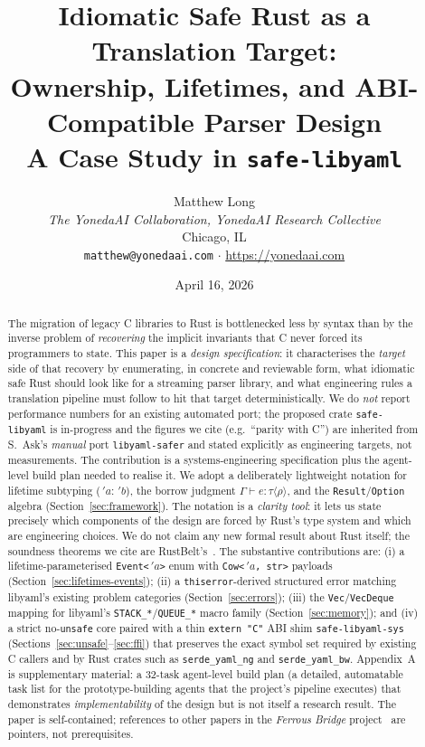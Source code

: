\documentclass[12pt]{article}
\title{Idiomatic Safe Rust as a Translation Target:\\
Ownership, Lifetimes, and ABI-Compatible Parser Design\\
{\large A Case Study in \texttt{safe-libyaml}}}
\author{Matthew Long \\
\textit{The YonedaAI Collaboration, YonedaAI Research Collective} \\
Chicago, IL \\
\texttt{matthew@yonedaai.com} $\cdot$ \url{https://yonedaai.com}}
\date{April 16, 2026}
\theoremstyle{definition}
\theoremstyle{remark}
\newcommand{\lifetime}[1]{\ensuremath{\,'\!#1}}
\newcommand{\outlives}{\ensuremath{:}}
\newcommand{\judg}[3]{\ensuremath{#1 \vdash #2 : #3}}
\begin{document}
\maketitle

\begin{abstract}
The migration of legacy C libraries to Rust is bottlenecked less by syntax than
by the inverse problem of \emph{recovering} the implicit invariants that C never
forced its programmers to state. This paper is a \emph{design specification}:
it characterises the \emph{target} side of that recovery by enumerating, in
concrete and reviewable form, what idiomatic safe Rust should look like for
a streaming parser library, and what engineering rules a translation pipeline
must follow to hit that target deterministically.
We do \emph{not} report performance numbers for an existing automated port;
the proposed crate \texttt{safe-libyaml} is in-progress and the figures we
cite (e.g.\ ``parity with C'') are inherited from S.~Ask's \emph{manual}
port \texttt{libyaml-safer} and stated explicitly as engineering targets,
not measurements. The contribution is a systems-engineering specification
plus the agent-level build plan needed to realise it.
We adopt a deliberately lightweight notation for lifetime subtyping
($\lifetime{a} \outlives \lifetime{b}$), the borrow judgment
$\judg{\Gamma}{e}{\tau\langle\rho\rangle}$, and the
\texttt{Result}/\texttt{Option} algebra (Section~\ref{sec:framework}). The
notation is a \emph{clarity tool}: it lets us state precisely which
components of the design are forced by Rust's type system and which are
engineering choices. We do not claim any new formal result about Rust
itself; the soundness theorems we cite are RustBelt's~\cite{rustbelt}.
The substantive contributions are: (i) a lifetime-parameterised
\texttt{Event<\lifetime{a}>} enum with \texttt{Cow<\lifetime{a}, str>}
payloads (Section~\ref{sec:lifetimes-events}); (ii) a
\texttt{thiserror}-derived structured error matching libyaml's existing
problem categories (Section~\ref{sec:errors}); (iii) the
\texttt{Vec}/\texttt{VecDeque} mapping for libyaml's
\texttt{STACK\_*}/\texttt{QUEUE\_*} macro family (Section~\ref{sec:memory});
and (iv) a strict no-\texttt{unsafe} core paired with a thin
\texttt{extern "C"} ABI shim \texttt{safe-libyaml-sys}
(Sections~\ref{sec:unsafe}--\ref{sec:ffi}) that preserves the exact symbol
set required by existing C callers and by Rust crates such as
\texttt{serde\_yaml\_ng} and \texttt{serde\_yaml\_bw}. Appendix~A is
supplementary material: a 32-task agent-level build plan (a detailed,
automatable task list for the prototype-building agents that the project's
pipeline executes) that demonstrates \emph{implementability} of the design
but is not itself a research result.
The paper is self-contained; references to other papers in the
\emph{Ferrous Bridge} project~\cite{long-c, long-transpile,
long-c2rust-strategy} are pointers, not prerequisites.
\end{abstract}
\end{document}
